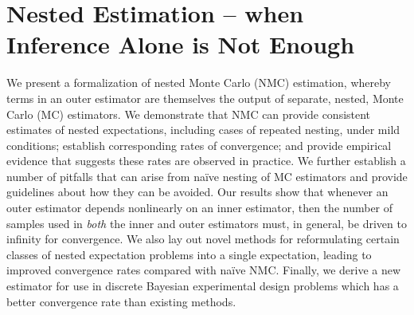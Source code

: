 
\chapter{Nested Estimation -- when Inference Alone is Not Enough}
\label{chp:nest}


We present a formalization of nested Monte Carlo (NMC) estimation, whereby
terms in an outer estimator are themselves the output of separate, nested, Monte Carlo (MC) estimators.
We demonstrate that NMC can provide consistent estimates of 
nested expectations, including cases of repeated nesting, under mild conditions;
establish corresponding rates of convergence;
and provide empirical evidence that suggests these rates are observed in practice.
We further establish a number of pitfalls that can arise from na\"{i}ve nesting of MC estimators
and provide guidelines about how they can be avoided.
Our results show that whenever an outer estimator depends nonlinearly on an inner
estimator, then the number of samples used in \emph{both} the inner and outer estimators
must, in general, be driven to infinity for convergence.  
We also lay out novel methods for reformulating certain classes of nested expectation problems
into a single expectation, leading to improved convergence rates compared with na\"{i}ve NMC.
Finally, we derive a new estimator for use in discrete Bayesian 
experimental design problems which has a better convergence rate than 
existing methods.










\clearpage


